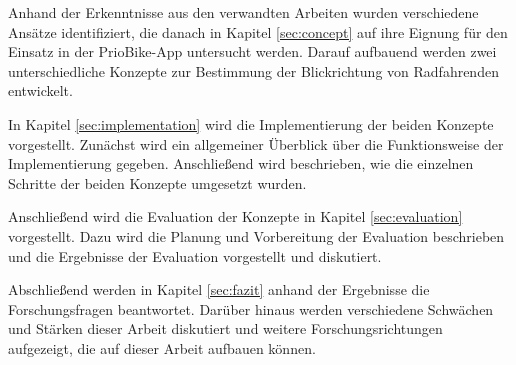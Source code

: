 Anhand der Erkenntnisse aus den verwandten Arbeiten wurden verschiedene Ansätze identifiziert, die danach in Kapitel \ref{sec:concept} auf ihre Eignung für den Einsatz in der PrioBike-App untersucht werden. Darauf aufbauend werden zwei unterschiedliche Konzepte zur Bestimmung der Blickrichtung von Radfahrenden entwickelt. 

In Kapitel \ref{sec:implementation} wird die Implementierung der beiden Konzepte vorgestellt. Zunächst wird ein allgemeiner Überblick über die Funktionsweise der Implementierung gegeben. Anschließend wird beschrieben, wie die einzelnen Schritte der beiden Konzepte umgesetzt wurden.

Anschließend wird die Evaluation der Konzepte in Kapitel \ref{sec:evaluation} vorgestellt. Dazu wird die Planung und Vorbereitung der Evaluation beschrieben und die Ergebnisse der Evaluation vorgestellt und diskutiert.

Abschließend werden in Kapitel \ref{sec:fazit} anhand der Ergebnisse die Forschungsfragen 
beantwortet. Darüber hinaus werden verschiedene Schwächen und Stärken dieser Arbeit diskutiert und weitere Forschungsrichtungen aufgezeigt, die auf dieser Arbeit aufbauen können.




